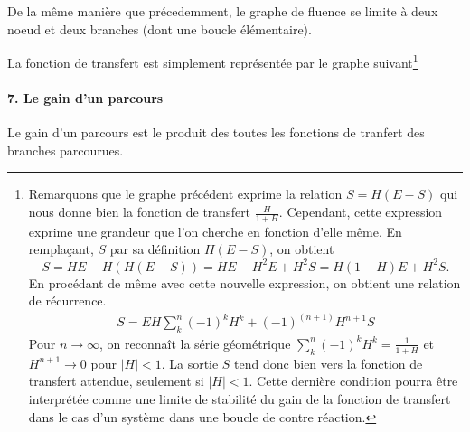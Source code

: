 De la même manière que précedemment, le graphe de fluence se limite à 
deux noeud et deux branches (dont une boucle élémentaire).
\begin{center}
    
\end{center}
La fonction de transfert est simplement représentée par le graphe 
suivant\footnote{Remarquons que le graphe précédent exprime la relation 
$S=H(E-S)$ qui nous donne bien la fonction de transfert $\frac{H}{1+H}$. 
Cependant, cette expression exprime une grandeur que l'on cherche en fonction 
d'elle même. En remplaçant, $S$ par sa définition $H(E-S)$, on obtient
\[
    S=HE-H(H(E-S))=HE-H^2E+H^2S=H(1-H)E+H^2S.
\]
En procédant de même avec cette nouvelle expression, on obtient une 
relation de récurrence. 
\begin{align*}
    S=EH\sum_k^n (-1)^kH^k+(-1)^{(n+1)}H^{n+1}S
\end{align*}
Pour $n\rightarrow\infty$, on reconnaît la série géométrique 
$\sum_k^n(-1)^kH^k=\frac{1}{1+H}$ et $H^{n+1}\rightarrow 0$ pour $|H|<1$.
La sortie $S$ tend donc bien vers la fonction de transfert attendue, 
seulement si $|H|<1$. Cette dernière condition pourra être interprétée 
comme une limite de stabilité du gain de la fonction de transfert dans 
le cas d'un système dans une boucle de contre réaction.}
\begin{center}
    
\end{center}
\paragraph{7. Le gain d'un parcours}
Le gain d'un parcours est le produit des toutes 
les fonctions de tranfert des branches parcourues. 
